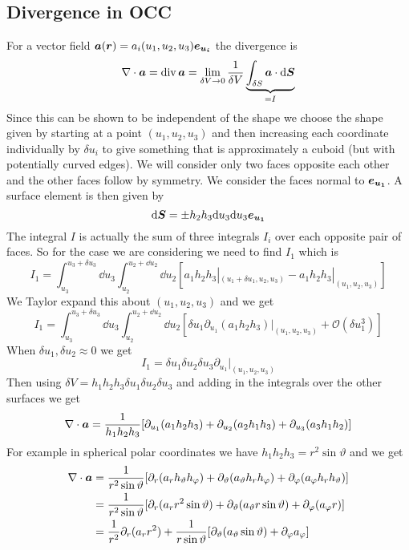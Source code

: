 \documentclass{article}
\newcommand{\divword}{\mathop{\mathrm{div}}}
\begin{document}
    \subsection{Divergence in OCC}
    For a vector field \(\bm{a}(\bm{r}) = a_i(u_1, u_2, u_3)\bm{e_{u_i}}\) the divergence is
    \[\div\vv a = \divword\vv a = \lim_{\delta V\to 0}\frac{1}{\delta V}\underbrace{\int_{\delta S}\vv a\cdot\dd\vv S}_{ = I}\]
    Since this can be shown to be independent of the shape we choose the shape given by starting at a point \((u_1, u_2, u_3)\) and then increasing each coordinate individually by \(\delta u_i\) to give something that is approximately a cuboid (but with potentially curved edges).
    We will consider only two faces opposite each other and the other faces follow by symmetry.
    We consider the faces normal to \(\bm{e_{u_1}}\).
    A surface element is then given by
    \[\dd\bm{S} = \pm h_2h_3\dd u_3\dd u_3\bm{e_{u_1}}\]
    The integral \(I\) is actually the sum of three integrals \(I_i\) over each opposite pair of faces.
    So for the case we are considering we need to find \(I_1\) which is
    \[I_1 = \int_{u_3}^{u_3 + \delta u_3}\dd u_3 \int_{u_2}^{u_2 + \dd u_2}\dd u_2 [a_1h_2h_3|_{(u_1 + \delta u_1, u_2, u_3)} - a_1h_2h_3|_{(u_1, u_2, u_3)}]\]
    We Taylor expand this about \((u_1, u_2, u_3)\) and we get
    \[I_1 = \int_{u_3}^{u_3 + \delta u_3}\dd u_3 \int_{u_2}^{u_2 + \dd u_2}\dd u_2 [\delta u_1\partial_{u_1}(a_1h_2h_3)|_{(u_1, u_2, u_3)} + \mathcal{O}(\delta u_1^3)]\]
    When \(\delta u_1, \delta u_2\approx 0\) we get
    \[I_1 = \delta u_1\delta u_2\delta u_3\partial_{u_1}|_{(u_1, u_2, u_3)}\]
    Then using \(\delta V = h_1h_2h_3\delta u_1\delta u_2\delta u_3\) and adding in the integrals over the other surfaces we get
    \[\nabla\cdot\bm{a} = \frac{1}{h_1h_2h_3}[\partial_{u_1}(a_1h_2h_3) + \partial_{u_2}(a_2h_1h_3) + \partial_{u_3}(a_3h_1h_2)]\]
    For example in spherical polar coordinates we have \(h_1h_2h_3 = r^2\sin\vartheta\) and we get
    \begin{align*}
        \nabla\cdot\bm{a} &= \frac{1}{r^2\sin\vartheta}[\partial_r(a_rh_\vartheta h_\varphi) + \partial_\vartheta(a_\vartheta h_r h_\varphi) + \partial_\varphi(a_\varphi h_r h_\vartheta)]\\
        &= \frac{1}{r^2\sin\vartheta}[\partial_r(a_r r^2\sin\vartheta) + \partial_\vartheta(a_\vartheta r\sin\vartheta) + \partial_\varphi(a_\varphi r)]\\
        &= \frac{1}{r^2}\partial_r(a_rr^2) + \frac{1}{r\sin\vartheta}[\partial_\vartheta(a_\vartheta\sin\vartheta) + \partial_\varphi a_\varphi]
    \end{align*}
    
\end{document}
